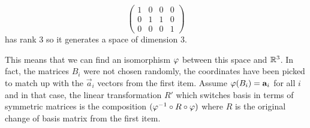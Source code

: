 \documentclass[12pt]{memoir}
\begin{document}
\begin{ptcbr}
\begin{enumerate}[(i)]
$$            \begin{pmatrix}
                1&0&0&0\\ 0&1&1&0\\ 0&0&0&1
                \end{pmatrix}$$
        has rank $3$ so it generates a space of dimension $3$.
    \end{enumerate}
    This means that we can find an isomorphism $\varphi$ between this space and $\mathbb{R}^3$. In fact, the matrices $B_i$ were not chosen randomly, the coordinates have been picked to match up with the $\vec a_i$ vectors from the first item. Assume $\varphi(B_i)=\mathbf{a}_i$ for all $i$ and in that case, the linear transformation $R'$ which switches basis in terms of symmetric matrices is the composition $(\varphi^{-1}\circ R\circ\varphi)$ where $R$ is the original change of basis matrix from the first item.
\end{ptcbr}
\end{document}
